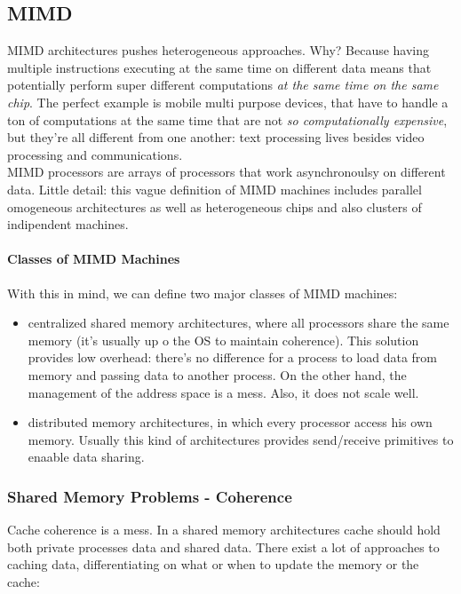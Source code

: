 \documentclass[10pt,a4paper]{article}
\begin{document}
			\subsection{MIMD}
				MIMD architectures pushes heterogeneous approaches. Why? Because having multiple instructions executing at the same time on different data means that potentially perform super different computations \emph{at the same time on the same chip}. The perfect example is mobile multi purpose devices, that have to handle a ton of computations at the same time that are not \emph{so computationally expensive}, but they're all different from one another: text processing lives besides video processing and communications.\\
				MIMD processors are arrays of processors that work asynchronoulsy on different data. Little detail: this vague definition of MIMD machines includes parallel omogeneous architectures as well as heterogeneous chips and also clusters of indipendent machines.\\
				
				\paragraph{Classes of MIMD Machines}
					With this in mind, we can define two major classes of MIMD machines:
					\begin{itemize}
						\item centralized shared memory architectures, where all processors share the same memory (it's usually up o the OS to maintain coherence). This solution provides low overhead: there's no difference for a process to load data from memory and passing data to another process. On the other hand, the management of the address space is a mess. Also, it does not scale well.
						\item distributed memory architectures, in which every processor access his own memory. Usually this kind of architectures provides send/receive primitives to enaable data sharing. 
					\end{itemize}
					
				\subsubsection{Shared Memory Problems - Coherence}
					Cache coherence is a mess. In a shared memory architectures cache should hold both private processes data and shared data. There exist a lot of approaches to caching data, differentiating on what or when to update the memory or the cache: 
					
\end{document}
